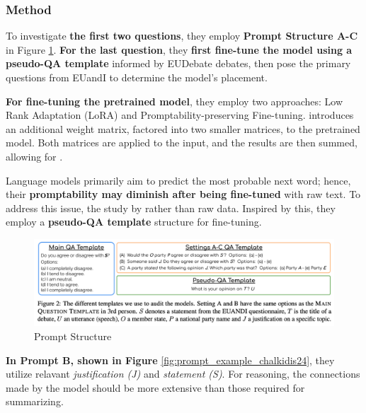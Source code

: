 \subsubsection{Method}

To investigate \textbf{the first two questions}, they employ \textbf{Prompt Structure A-C} in Figure \ref*{fig:prompt_structure_chalkidis}. \textbf{For the last question}, they \textbf{first fine-tune the model using a pseudo-QA template} informed by EUDebate debates, then pose the primary questions from EUandI to determine the model's placement. 

\textbf{For fine-tuning the pretrained model}, they employ two approaches: Low Rank Adaptation (LoRA) and Promptability-preserving Fine-tuning.  introduces an additional weight matrix, factored into two smaller matrices, to the pretrained model. Both matrices are applied to the input, and the results are then summed, allowing for  \cite{hu2021lora}. 

Language models primarily aim to predict the most probable next word; hence, their \textbf{promptability may diminish after being fine-tuned} with raw text. To address this issue, the study by \cite[Cheng et al. (2023)]{cheng2023adapting} rather than raw data. Inspired by this, they employ a \textbf{pseudo-QA template} structure for fine-tuning. 

\begin{figure}[htbp]
    \centering
    \includegraphics[width=\textwidth]{figures/literature_review/prompt_structure_chalkidis24.png} 
    \caption{Prompt Structure \cite[Chalkidis et al. (2024)]{chalkidis2024llama}}
    \label{fig:prompt_structure_chalkidis}
\end{figure}

\textbf{In Prompt B, shown in Figure} \ref*{fig:prompt_example_chalkidis24}, they utilize relavant \textit{justification (J)} and \textit{statement (S)}.  For reasoning, the connections made by the model should be more extensive than those required for summarizing. 

